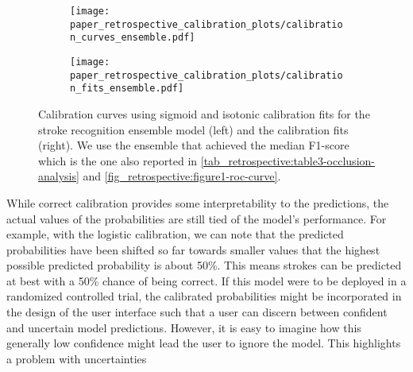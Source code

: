 \begin{figure}
    \begin{subfigure}[c]{0.48\columnwidth}
        \centering
        \texttt{[image: paper\_retrospective\_calibration\_plots/calibration\_curves\_ensemble.pdf]}
    \end{subfigure}
    \begin{subfigure}[c]{0.48\columnwidth}
        \centering
        \texttt{[image: paper\_retrospective\_calibration\_plots/calibration\_fits\_ensemble.pdf]}
    \end{subfigure}
    \caption[Calibration fits and curves for the stroke recognition model using Platt-scaling and isotonic regression for calibration.]{ Calibration curves using sigmoid and isotonic calibration fits for the stroke recognition ensemble model (left) and the calibration fits (right). We use the ensemble that achieved the median F1-score which is the one also reported in \cref{tab_retrospective:table3-occlusion-analysis} and \cref{fig_retrospective:figure1-roc-curve}.}
    \label{fig_discussion:retrospective-paper-calibration-curve-sigmoid-isotonic}
\end{figure}

While correct calibration provides some interpretability to the predictions, the actual values of the probabilities are still tied of the model's performance. For example, with the logistic calibration, we can note that the predicted probabilities have been shifted so far towards smaller values that the highest possible predicted probability is about 50\%. This means strokes can be predicted at best with a 50\% chance of being correct. 
If this model were to be deployed in a randomized controlled trial, the calibrated probabilities might be incorporated in the design of the user interface such that a user can discern between confident and uncertain model predictions. However, it is easy to imagine how this generally low confidence might lead the user to ignore the model. This highlights a problem with uncertainties




